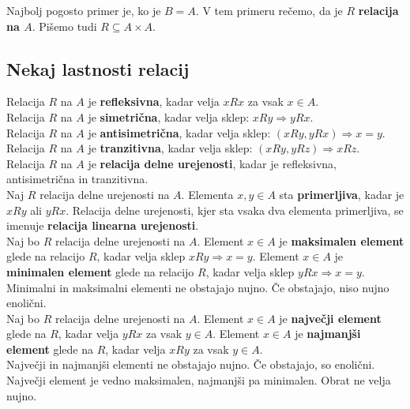 \documentclass[a4paper,12pt]{article}
\begin{document}
Najbolj pogosto primer je, ko je $B=A$. V tem primeru rečemo, da je $R$ \textbf{relacija na $A$}. Pišemo tudi $R\subseteq A\times A$. \\

\subsection{Nekaj lastnosti relacij}

Relacija $R$ na $A$ je \textbf{refleksivna}, kadar velja $xRx$ za vsak $x\in A$. \\

Relacija $R$ na $A$ je \textbf{simetrična}, kadar velja sklep: $xRy\Rightarrow yRx$. \\

Relacija $R$ na $A$ je \textbf{antisimetrična}, kadar velja sklep: $(xRy,yRx)\Rightarrow x=y$.\\

Relacija $R$ na $A$ je \textbf{tranzitivna}, kadar velja sklep: $(xRy,yRz)\Rightarrow xRz$.\\

Relacija $R$ na $A$ je \textbf{relacija delne urejenosti}, kadar je refleksivna, antisimetrična in tranzitivna.\\

Naj $R$ relacija delne urejenosti na $A$. Elementa $x,y\in A$ sta \textbf{primerljiva}, kadar je $xRy$ ali $yRx$. Relacija delne urejenosti, kjer sta vsaka dva elementa primerljiva, se imenuje \textbf{relacija linearna urejenosti}. \\

Naj bo $R$ relacija delne urejenosti na $A$. Element $x\in A$ je \textbf{maksimalen element} glede na relacijo $R$, kadar velja sklep $xRy\Rightarrow x=y$. Element $x\in A$ je \textbf{minimalen element} glede na relacijo $R$, kadar velja sklep $yRx\Rightarrow x=y$. \\

Minimalni in maksimalni elementi ne obstajajo nujno. Če obstajajo, niso nujno enolični. \\

Naj bo $R$ relacija delne urejenosti na $A$. Element $x\in A$ je \textbf{največji element} glede na $R$, kadar velja $yRx$ za vsak $y\in A$. Element $x\in A$ je \textbf{najmanjši element} glede na $R$, kadar velja $xRy$ za vsak $y\in A$. \\

Največji in najmanjši elementi ne obstajajo nujno. Če obstajajo, so enolični. Največji element je vedno maksimalen, najmanjši pa minimalen. Obrat ne velja nujno. \\
\end{document}
